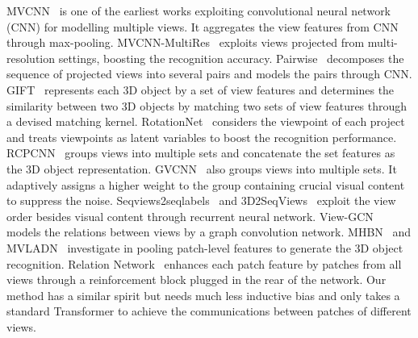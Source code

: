 \documentclass{bmvc2k}
\begin{document}
MVCNN~\cite{su2015multi} is one of the earliest works exploiting convolutional neural network (CNN) for modelling multiple views. It aggregates the view features from CNN through max-pooling.  MVCNN-MultiRes~\cite{qi2016volumetric} exploits views projected from multi-resolution settings, boosting the recognition accuracy. Pairwise~\cite{johns2016pairwise} decomposes the sequence of projected views into several pairs and models the pairs through CNN.  GIFT~\cite{bai2016gift} represents each 3D object by a set of view features and determines the similarity between two 3D objects by matching two sets of view features through a devised matching kernel. RotationNet~\cite{kanezaki2018rotationnet} considers the viewpoint of each project and treats viewpoints as latent variables to boost the recognition performance. 
RCPCNN~\cite{wang2017dominant} groups views into multiple sets and concatenate the set features as the 3D object representation. GVCNN~\cite{feng2018gvcnn} also groups views into multiple sets. It adaptively assigns a higher weight to the group containing crucial visual content to suppress the noise. Seqviews2seqlabels~\cite{DBLP:journals/tip/HanSLVLZHC19} and 3D2SeqViews~\cite{DBLP:journals/tip/HanLLVLZHC19} exploit the view order besides visual content through recurrent neural network.   View-GCN~\cite{Wei_2020_CVPR} models the relations between views by a graph convolution network. MHBN~\cite{yu2018multi} and MVLADN~\cite{DBLP:journals/tip/YuMYY21} investigate in pooling patch-level features to generate the 3D object recognition.  Relation Network~\cite{mvrelations} enhances each patch feature by patches from all views through a reinforcement block plugged in the rear of the network. Our method has a similar spirit but needs much less inductive bias and only takes a standard Transformer to achieve the communications between patches of different views.
\end{document}
